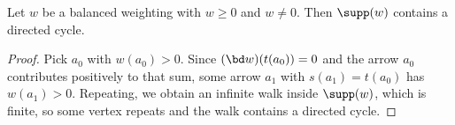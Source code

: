 \begin{lemma}[Support]\label{sh-0401}
Let $w$ be a balanced weighting with $w \geq 0$ and $w \neq 0$. Then $\supp(w)$ contains a directed cycle.
\end{lemma}
\begin{proof}
Pick $a_{0}$ with $w(a_{0}) > 0$. Since $(\bd w)(t(a_{0})) = 0$ and the arrow $a_{0}$ contributes positively to that sum, some arrow $a_{1}$ with $s(a_{1}) = t(a_{0})$ has $w(a_{1}) > 0$. Repeating, we obtain an infinite walk inside $\supp(w)$, which is finite, so some vertex repeats and the walk contains a directed cycle.
\end{proof}
